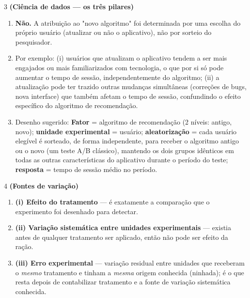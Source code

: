 \documentclass[11pt]{article}
\begin{document}
\begin{questao}{3} \textbf{(Ciência de dados --- os três pilares)}
\end{questao}
\begin{solucao}
\begin{enumerate}[label=(\alph*)]
  \item \textbf{Não.} A atribuição ao "novo algoritmo" foi determinada por uma escolha do
    próprio usuário (atualizar ou não o aplicativo), não por sorteio do pesquisador.
  \item Por exemplo: (i) usuários que atualizam o aplicativo tendem a ser mais engajados ou mais
    familiarizados com tecnologia, o que por si só pode aumentar o tempo de sessão,
    independentemente do algoritmo; (ii) a atualização pode ter trazido outras mudanças
    simultâneas (correções de bugs, nova interface) que também afetam o tempo de sessão,
    confundindo o efeito específico do algoritmo de recomendação.
  \item Desenho sugerido: \textbf{Fator} = algoritmo de recomendação (2 níveis: antigo, novo);
    \textbf{unidade experimental} = usuário; \textbf{aleatorização} = cada usuário elegível é
    sorteado, de forma independente, para receber o algoritmo antigo ou o novo (um teste A/B
    clássico), mantendo os dois grupos idênticos em todas as outras características do
    aplicativo durante o período do teste; \textbf{resposta} = tempo de sessão médio no período.
\end{enumerate}
\end{solucao}

\begin{questao}{4} \textbf{(Fontes de variação)}
\end{questao}
\begin{solucao}
\begin{enumerate}[label=(\alph*)]
  \item \textbf{(i) Efeito do tratamento} — é exatamente a comparação que o experimento foi
    desenhado para detectar.
  \item \textbf{(ii) Variação sistemática entre unidades experimentais} — existia antes de
    qualquer tratamento ser aplicado, então não pode ser efeito da ração.
  \item \textbf{(iii) Erro experimental} — variação residual entre unidades que receberam o
    \emph{mesmo} tratamento e tinham a \emph{mesma} origem conhecida (ninhada); é o que resta
    depois de contabilizar tratamento e a fonte de variação sistemática conhecida.
\end{enumerate}
\end{solucao}
\end{document}
